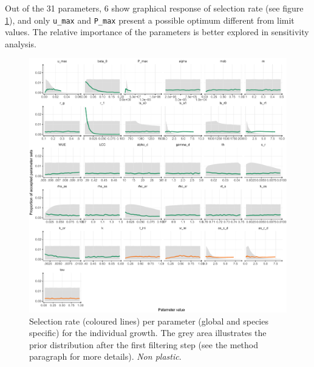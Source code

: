Out of the 31 parameters, 6 show graphical response of selection rate (see figure \ref{fig:accept_rate}), and only  \texttt{u\_max} and \texttt{P\_max} present a possible optimum different from limit values. The relative importance of the parameters is better explored in sensitivity analysis.







\begin{figure}[p]
\includegraphics[width = \textwidth]{./2_PP/Figures/Calibration/acceptance_rate_RSRnWeight_per_par_none.pdf}
\caption[Selection rate of all parameters.]{Selection rate (coloured lines) per parameter  (\textcolor{myGreen}{global} and \textcolor{myOrange}{species specific}) for the individual growth. The grey area illustrates the prior distribution after the first filtering step (see the method paragraph for more details). \textit{Non plastic}.}\label{fig:accept_rate}
\end{figure}


